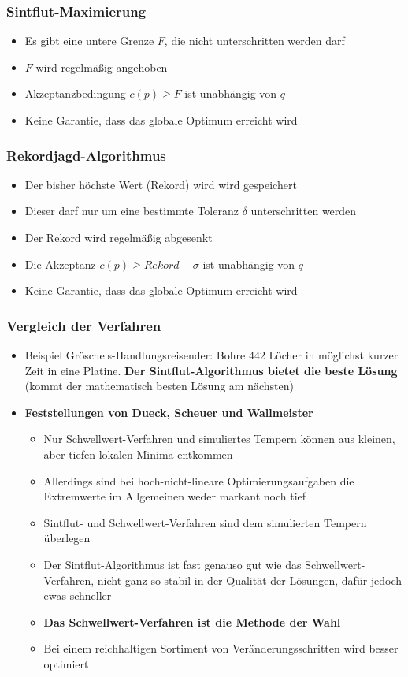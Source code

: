 \subsubsection{Sintflut-Maximierung}
\begin{itemize}
	\item Es gibt eine untere Grenze \(F\), die nicht unterschritten werden darf
	\item \(F\) wird regelmäßig angehoben
	\item Akzeptanzbedingung \(c(p) \geq F\) ist unabhängig von \(q\)
	\item Keine Garantie, dass das globale Optimum erreicht wird
\end{itemize}

\subsubsection{Rekordjagd-Algorithmus}
\begin{itemize}
	\item Der bisher höchste Wert (Rekord) wird wird gespeichert
	\item Dieser darf nur um eine bestimmte Toleranz \(\delta\) unterschritten werden
	\item Der Rekord wird regelmäßig abgesenkt
	\item Die Akzeptanz \(c(p) \geq Rekord-\sigma\) ist unabhängig von \(q\)
	\item Keine Garantie, dass das globale Optimum erreicht wird
\end{itemize}

\subsubsection{Vergleich der Verfahren}
\begin{itemize}
	\item Beispiel Gröschels-Handlungsreisender: Bohre 442 Löcher in möglichst kurzer Zeit in eine Platine. \textbf{Der Sintflut-Algorithmus bietet die beste Lösung} (kommt der mathematisch besten Lösung am nächsten)
	\item \textbf{Feststellungen von Dueck, Scheuer und Wallmeister}
	\begin{itemize}
		\item Nur Schwellwert-Verfahren und simuliertes Tempern können aus kleinen, aber tiefen lokalen Minima entkommen
		\item Allerdings sind bei hoch-nicht-lineare Optimierungsaufgaben die Extremwerte im Allgemeinen weder markant noch tief
		\item Sintflut- und Schwellwert-Verfahren sind dem simulierten Tempern überlegen
		\item Der Sintflut-Algorithmus ist fast genauso gut wie das Schwellwert-Verfahren, nicht ganz so stabil in der Qualität der Lösungen, dafür jedoch ewas schneller
		\item \textbf{Das Schwellwert-Verfahren ist die Methode der Wahl}
		\item Bei einem reichhaltigen Sortiment von Veränderungsschritten wird besser optimiert
	\end{itemize}
\end{itemize}


